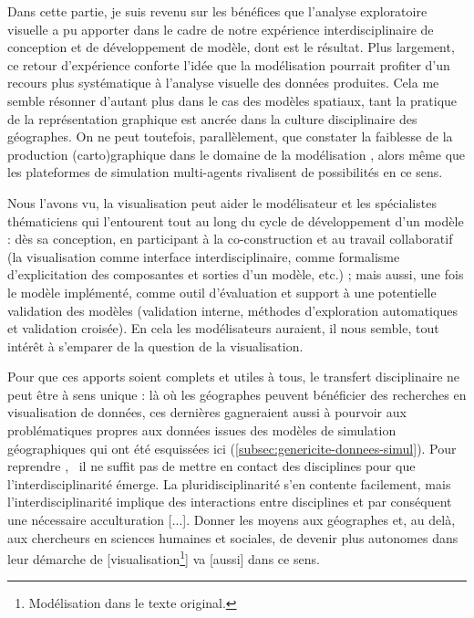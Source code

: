 Dans cette partie, je suis revenu sur les bénéfices que l'analyse exploratoire visuelle a pu apporter dans le cadre de notre expérience interdisciplinaire de conception et de développement de modèle, dont \simfeodal{} est le résultat.
Plus largement, ce retour d'expérience conforte l'idée que la modélisation pourrait profiter d'un recours plus systématique à l'analyse visuelle des données produites.
Cela me semble résonner d'autant plus dans le cas des modèles spatiaux, tant la pratique de la représentation graphique est ancrée dans la culture disciplinaire des géographes.
On ne peut toutefois, parallèlement, que constater la faiblesse de la production (carto)graphique dans le domaine de la modélisation \autocite[Introduction]{cura_visualisation_2020}, alors même que les plateformes de simulation multi-agents rivalisent de possibilités en ce sens.

Nous l'avons vu, la visualisation peut aider le modélisateur et les spécialistes thématiciens qui l'entourent tout au long du cycle de développement d'un modèle :
	dès sa conception, en participant à la co-construction et au travail collaboratif (la visualisation comme interface interdisciplinaire, comme formalisme d'explicitation des composantes et sorties d'un modèle, etc.) ; mais aussi, une fois le modèle implémenté, comme outil d'évaluation et support à une potentielle validation des modèles (validation interne, méthodes d'exploration automatiques et validation croisée).
En cela les modélisateurs auraient, il nous semble, tout intérêt à s'emparer de la question de la visualisation.

Pour que ces apports soient complets et utiles à tous, le transfert disciplinaire ne peut être à sens unique :
	là où les géographes peuvent bénéficier des recherches en visualisation de données, ces dernières gagneraient aussi à pourvoir aux problématiques propres aux données issues des modèles de simulation géographiques qui ont été esquissées ici (\cref{subsec:genericite-donnees-simul}).
Pour reprendre \textcite[76]{banos_pour_2013}, \og il ne suffit pas de mettre en contact des disciplines pour que l'interdisciplinarité émerge.
La pluridisciplinarité s'en contente facilement, mais l'interdisciplinarité implique des interactions entre disciplines et par conséquent une nécessaire acculturation [...].
Donner les moyens aux géographes et, au delà, aux chercheurs en sciences humaines et sociales, de devenir plus autonomes dans leur démarche de [visualisation\footnote{
	\og Modélisation\fg{} dans le texte original.
}] va [aussi] dans ce sens\fg{}.


